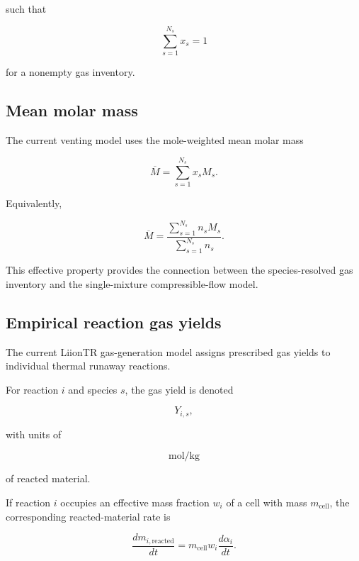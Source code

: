 such that

\begin{equation}
    \sum_{s=1}^{N_s}
    x_s
    =
    1
\end{equation}

for a nonempty gas inventory.


\subsection{Mean molar mass}

The current venting model uses the mole-weighted mean molar mass

\begin{equation}
    \overline{M}
    =
    \sum_{s=1}^{N_s}
    x_s M_s.
    \label{eq:mean_molar_mass}
\end{equation}

Equivalently,

\begin{equation}
    \overline{M}
    =
    \frac{
        \displaystyle
        \sum_{s=1}^{N_s}
        n_s M_s
    }{
        \displaystyle
        \sum_{s=1}^{N_s}
        n_s
    }.
\end{equation}

This effective property provides the connection between the
species-resolved gas inventory and the single-mixture compressible-flow
model.


\subsection{Empirical reaction gas yields}

The current LiionTR gas-generation model assigns prescribed gas yields to
individual thermal runaway reactions.

For reaction $i$ and species $s$, the gas yield is denoted

\begin{equation}
    Y_{i,s},
\end{equation}

with units of

\begin{equation}
    \si{\mole\per\kilogram}
\end{equation}

of reacted material.

If reaction $i$ occupies an effective mass fraction $w_i$ of a cell with
mass $m_{\mathrm{cell}}$, the corresponding reacted-material rate is

\begin{equation}
    \frac{dm_{i,\mathrm{reacted}}}{dt}
    =
    m_{\mathrm{cell}}
    w_i
    \frac{d\alpha_i}{dt}.
    \label{eq:reacted_material_rate}
\end{equation}

